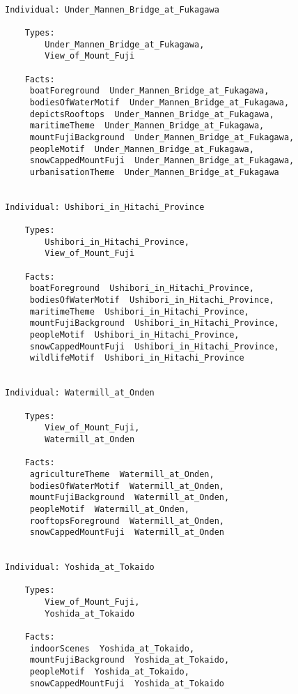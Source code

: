 \documentclass[titlepage,a4paper,12pt,oneside]{book}
\begin{document}
\begin{appendices}
\begin{lstlisting}
    
Individual: Under_Mannen_Bridge_at_Fukagawa

    Types: 
        Under_Mannen_Bridge_at_Fukagawa,
        View_of_Mount_Fuji
    
    Facts:  
     boatForeground  Under_Mannen_Bridge_at_Fukagawa,
     bodiesOfWaterMotif  Under_Mannen_Bridge_at_Fukagawa,
     depictsRooftops  Under_Mannen_Bridge_at_Fukagawa,
     maritimeTheme  Under_Mannen_Bridge_at_Fukagawa,
     mountFujiBackground  Under_Mannen_Bridge_at_Fukagawa,
     peopleMotif  Under_Mannen_Bridge_at_Fukagawa,
     snowCappedMountFuji  Under_Mannen_Bridge_at_Fukagawa,
     urbanisationTheme  Under_Mannen_Bridge_at_Fukagawa
    
    
Individual: Ushibori_in_Hitachi_Province

    Types: 
        Ushibori_in_Hitachi_Province,
        View_of_Mount_Fuji
    
    Facts:  
     boatForeground  Ushibori_in_Hitachi_Province,
     bodiesOfWaterMotif  Ushibori_in_Hitachi_Province,
     maritimeTheme  Ushibori_in_Hitachi_Province,
     mountFujiBackground  Ushibori_in_Hitachi_Province,
     peopleMotif  Ushibori_in_Hitachi_Province,
     snowCappedMountFuji  Ushibori_in_Hitachi_Province,
     wildlifeMotif  Ushibori_in_Hitachi_Province
    
    
Individual: Watermill_at_Onden

    Types: 
        View_of_Mount_Fuji,
        Watermill_at_Onden
    
    Facts:  
     agricultureTheme  Watermill_at_Onden,
     bodiesOfWaterMotif  Watermill_at_Onden,
     mountFujiBackground  Watermill_at_Onden,
     peopleMotif  Watermill_at_Onden,
     rooftopsForeground  Watermill_at_Onden,
     snowCappedMountFuji  Watermill_at_Onden
    
    
Individual: Yoshida_at_Tokaido

    Types: 
        View_of_Mount_Fuji,
        Yoshida_at_Tokaido
    
    Facts:  
     indoorScenes  Yoshida_at_Tokaido,
     mountFujiBackground  Yoshida_at_Tokaido,
     peopleMotif  Yoshida_at_Tokaido,
     snowCappedMountFuji  Yoshida_at_Tokaido
    

\end{lstlisting}
\end{appendices}
\end{document}

